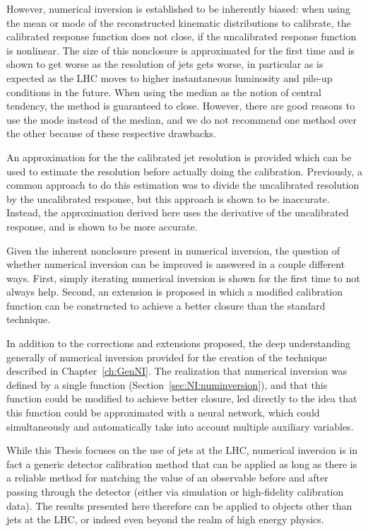 However, numerical inversion is established to be inherently biased: when using the mean or mode of the reconstructed kinematic distributions to calibrate, the calibrated response function does not close, if the uncalibrated response function is nonlinear.
The size of this nonclosure is approximated for the first time and is shown to get worse as the resolution of jets gets worse, in particular as is expected as the LHC moves to higher instantaneous luminosity and pile-up conditions in the future.
When using the median as the notion of central tendency, the method is guaranteed to close.
However, there are good reasons to use the mode instead of the median, and we do not recommend one method over the other because of these respective drawbacks.

An approximation for the the calibrated jet resolution is provided which can be used to estimate the resolution before actually doing the calibration.
Previously, a common approach to do this estimation was to divide the uncalibrated resolution by the uncalibrated response, but this approach is shown to be inaccurate.
Instead, the approximation derived here uses the derivative of the uncalibrated response, and is shown to be more accurate.

Given the inherent nonclosure present in numerical inversion, the question of whether numerical inversion can be improved is answered in a couple different ways. 
First, simply iterating numerical inversion is shown for the first time to not always help.
Second, an extension is proposed in which a modified calibration function can be constructed to achieve a better closure than the standard technique.

In addition to the corrections and extensions proposed, the deep understanding generally of numerical inversion provided for the creation of the technique described in Chapter~\ref{ch:GenNI}.
The realization that numerical inversion was defined by a single function (Section~\ref{sec:NI:numinversion}), and that this function could be modified to achieve better closure, led directly to the idea that this function could be approximated with a neural network, which could simultaneously and automatically take into account multiple auxiliary variables.

While this Thesis focuses on the use of jets at the LHC, numerical inversion is in fact a generic detector calibration method that can be applied as long as there is a reliable method for matching the value of an observable before and after passing through the detector (either via simulation or high-fidelity calibration data).
The results presented here therefore can be applied to objects other than jets at the LHC, or indeed even beyond the realm of high energy physics.

\clearpage
\newpage
